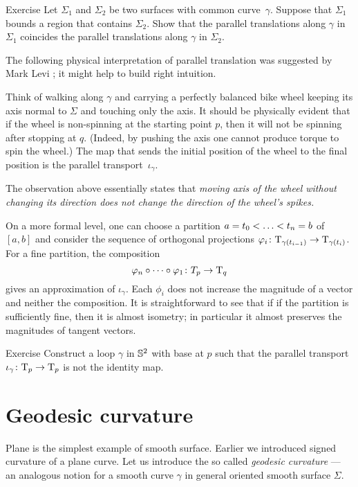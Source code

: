 \begin{thm}{Exercise}\label{ex:parallel-transport-support}
Let $\Sigma_1$ and $\Sigma_2$ be two surfaces with common curve~$\gamma$.
Suppose that $\Sigma_1$ bounds a region that contains $\Sigma_2$.
Show that the parallel translations along $\gamma$ in $\Sigma_1$ 
coincides the parallel translations along $\gamma$ in $\Sigma_2$. 
\end{thm}

The following physical interpretation of parallel translation was suggested by Mark Levi \cite{levi};
it might help to build right intuition.

Think of walking along $\gamma$ and carrying a perfectly balanced bike wheel keeping its axis normal to $\Sigma$ and touching only the axis.
It should be physically evident that if the wheel is non-spinning at the starting point $p$, then it will not be spinning after stopping at $q$.
(Indeed, by pushing the axis one cannot produce torque to spin the wheel.)
The map that sends the initial position of the wheel to the final position is  the parallel transport~$\iota_\gamma$.

The observation above essentially states that \emph{moving axis of the wheel without changing its direction does not change the direction of the wheel's spikes.}

On a more formal level, one can choose a partition $a=t_0<\dots\z<t_n=b$ of $[a,b]$
and consider the sequence of orthogonal projections $\varphi_i\colon\mathrm{T}_{\gamma(t_{i-1})}\to\mathrm{T}_{\gamma(t_i)}$.
For a fine partition, the composition 
\[\phi_n\circ\dots\circ\phi_1\:T_p\z\to\T_q\]
gives an approximation of $\iota_\gamma$.
Each $\phi_i$ does not increase the magnitude of a vector and neither the composition.
It is straightforward to see that if if the partition is sufficiently fine, then it is almost isometry; in particular it almost preserves the magnitudes of tangent vectors.

\begin{thm}{Exercise}\label{ex:holonomy=not0}
Construct a loop $\gamma$ in $\mathbb{S}^2$ with base at $p$ such that the parallel transport $\iota_\gamma\colon\mathrm{T}_p\to\mathrm{T}_p$ is not the identity map.
\end{thm}

\section*{Geodesic curvature}

Plane is the simplest example of smooth surface.
Earlier we introduced signed curvature of a plane curve.
Let us introduce the so called \emph{geodesic curvature} --- an analogous notion for a smooth curve $\gamma$ in general oriented smooth surface $\Sigma$.

